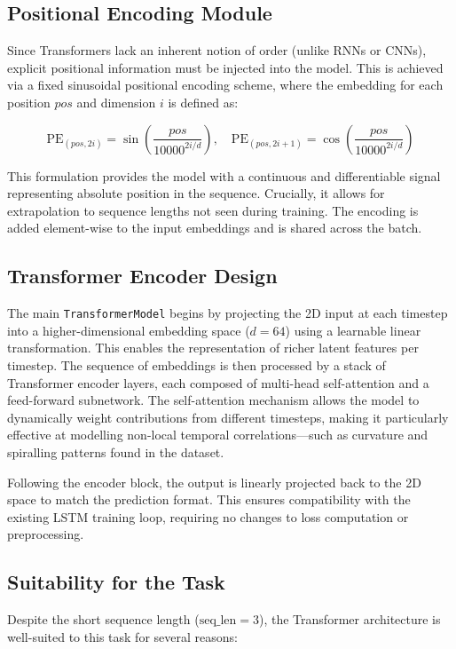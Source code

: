 \subsection*{Positional Encoding Module}

Since Transformers lack an inherent notion of order (unlike RNNs or CNNs), explicit positional information must be injected into the model. This is achieved via a fixed sinusoidal positional encoding scheme, where the embedding for each position $pos$ and dimension $i$ is defined as:

\[
\text{PE}_{(pos, 2i)} = \sin\left(\frac{pos}{10000^{2i / d}}\right), \quad 
\text{PE}_{(pos, 2i+1)} = \cos\left(\frac{pos}{10000^{2i / d}}\right)
\]

This formulation provides the model with a continuous and differentiable signal representing absolute position in the sequence. Crucially, it allows for extrapolation to sequence lengths not seen during training. The encoding is added element-wise to the input embeddings and is shared across the batch.

\subsection*{Transformer Encoder Design}

The main \texttt{TransformerModel} begins by projecting the 2D input at each timestep into a higher-dimensional embedding space ($d=64$) using a learnable linear transformation. This enables the representation of richer latent features per timestep. The sequence of embeddings is then processed by a stack of Transformer encoder layers, each composed of multi-head self-attention and a feed-forward subnetwork. The self-attention mechanism allows the model to dynamically weight contributions from different timesteps, making it particularly effective at modelling non-local temporal correlations—such as curvature and spiralling patterns found in the dataset.

Following the encoder block, the output is linearly projected back to the 2D space to match the prediction format. This ensures compatibility with the existing LSTM training loop, requiring no changes to loss computation or preprocessing.

\subsection*{Suitability for the Task}

Despite the short sequence length ($\text{seq\_len} = 3$), the Transformer architecture is well-suited to this task for several reasons:

